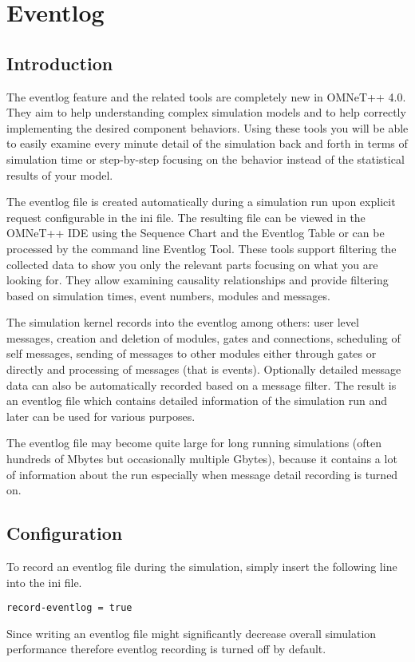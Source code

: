 \chapter{Eventlog}
\label{cha:eventlog}

\section{Introduction}
The eventlog feature and the related tools are completely new in OMNeT++ 4.0. They aim to
help understanding complex simulation models and to help correctly implementing the
desired component behaviors. Using these tools you will be able to easily examine every
minute detail of the simulation back and forth in terms of simulation time or step-by-step
focusing on the behavior instead of the statistical results of your model.

The eventlog file is created automatically during a simulation run upon explicit request
configurable in the ini file. The resulting file can be viewed in the OMNeT++ IDE using
the Sequence Chart and the Eventlog Table or can be processed by the command line Eventlog
Tool. These tools support filtering the collected data to show you only the relevant parts
focusing on what you are looking for. They allow examining causality relationships and
provide filtering based on simulation times, event numbers, modules and messages.

The simulation kernel records into the eventlog among others: user level messages,
creation and deletion of modules, gates and connections, scheduling of self messages,
sending of messages to other modules either through gates or directly and processing of
messages (that is events). Optionally detailed message data can also be automatically
recorded based on a message filter. The result is an eventlog file which contains detailed
information of the simulation run and later can be used for various purposes.

\begin{note}
The eventlog file may become quite large for long running simulations (often hundreds of
Mbytes but occasionally multiple Gbytes), because it contains a lot of information about
the run especially when message detail recording is turned on.
\end{note}

\section{Configuration}
To record an eventlog file during the simulation, simply insert the following line into
the ini file.
\begin{verbatim}
record-eventlog = true
\end{verbatim}
\begin{note}
Since writing an eventlog file might significantly decrease overall simulation performance
therefore eventlog recording is turned off by default.
\end{note}

